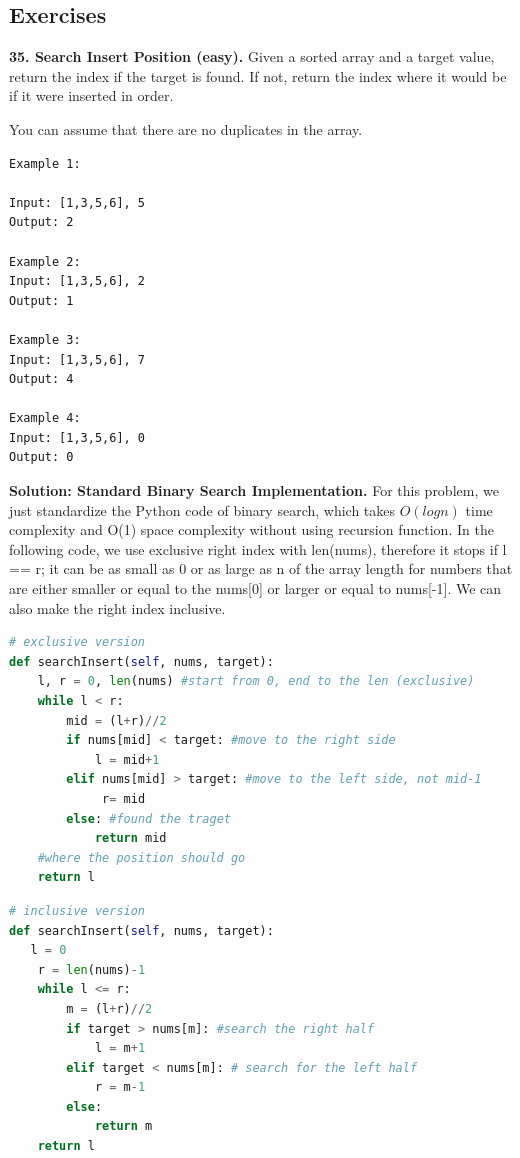 \documentclass[main.tex]{subfiles}
\begin{document}
\subsection{Exercises}
\begin{examples}
\item \textbf{35. Search Insert Position (easy).} Given a sorted array and a target value, return the index if the target is found. If not, return the index where it would be if it were inserted in order.

You can assume that there are no duplicates in the array.
\begin{lstlisting}[numbers=none]
Example 1:

Input: [1,3,5,6], 5
Output: 2

Example 2:
Input: [1,3,5,6], 2
Output: 1

Example 3:
Input: [1,3,5,6], 7
Output: 4

Example 4:
Input: [1,3,5,6], 0
Output: 0
\end{lstlisting}

\textbf{Solution: Standard Binary Search Implementation.} For this problem, we just standardize the Python code of binary search, which takes $O(logn)$ time complexity and O(1) space complexity without using recursion function. In the following code, we use exclusive right index with len(nums), therefore it stops if l == r; it can be as small as 0 or as large as n of the array length for numbers that are either smaller or equal to the nums[0] or larger or equal to nums[-1]. We can also make the right index inclusive. 
\begin{lstlisting}[language = Python]
# exclusive version
def searchInsert(self, nums, target):
    l, r = 0, len(nums) #start from 0, end to the len (exclusive)
    while l < r:
        mid = (l+r)//2
        if nums[mid] < target: #move to the right side
            l = mid+1
        elif nums[mid] > target: #move to the left side, not mid-1
             r= mid
        else: #found the traget
            return mid
    #where the position should go
    return l
\end{lstlisting}

\begin{lstlisting}[language = Python]
# inclusive version
def searchInsert(self, nums, target):
   l = 0
    r = len(nums)-1
    while l <= r:
        m = (l+r)//2
        if target > nums[m]: #search the right half
            l = m+1
        elif target < nums[m]: # search for the left half
            r = m-1
        else:
            return m
    return l
\end{lstlisting}
\end{examples}
\end{document}
